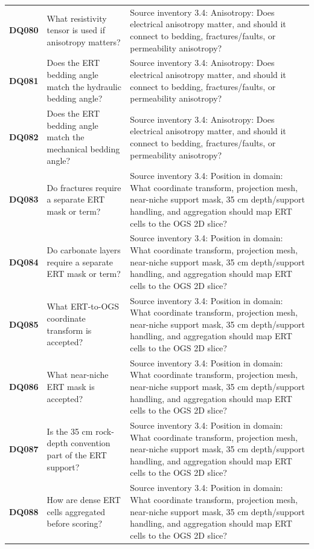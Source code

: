 \begin{longtable}{@{}L{0.09\textwidth} L{0.31\textwidth} L{0.52\textwidth}@{}}
\addlinespace[0.18em]
\textbf{DQ080} & What resistivity tensor is used if anisotropy matters? & Source inventory 3.4: Anisotropy: Does electrical anisotropy matter, and should it connect to bedding, fractures/faults, or permeability anisotropy?\\
\addlinespace[0.18em]
\textbf{DQ081} & Does the ERT bedding angle match the hydraulic bedding angle? & Source inventory 3.4: Anisotropy: Does electrical anisotropy matter, and should it connect to bedding, fractures/faults, or permeability anisotropy?\\
\addlinespace[0.18em]
\textbf{DQ082} & Does the ERT bedding angle match the mechanical bedding angle? & Source inventory 3.4: Anisotropy: Does electrical anisotropy matter, and should it connect to bedding, fractures/faults, or permeability anisotropy?\\
\addlinespace[0.18em]
\textbf{DQ083} & Do fractures require a separate ERT mask or term? & Source inventory 3.4: Position in domain: What coordinate transform, projection mesh, near-niche support mask, 35 cm depth/support handling, and aggregation should map ERT cells to the OGS 2D slice?\\
\addlinespace[0.18em]
\textbf{DQ084} & Do carbonate layers require a separate ERT mask or term? & Source inventory 3.4: Position in domain: What coordinate transform, projection mesh, near-niche support mask, 35 cm depth/support handling, and aggregation should map ERT cells to the OGS 2D slice?\\
\addlinespace[0.18em]
\textbf{DQ085} & What ERT-to-OGS coordinate transform is accepted? & Source inventory 3.4: Position in domain: What coordinate transform, projection mesh, near-niche support mask, 35 cm depth/support handling, and aggregation should map ERT cells to the OGS 2D slice?\\
\addlinespace[0.18em]
\textbf{DQ086} & What near-niche ERT mask is accepted? & Source inventory 3.4: Position in domain: What coordinate transform, projection mesh, near-niche support mask, 35 cm depth/support handling, and aggregation should map ERT cells to the OGS 2D slice?\\
\addlinespace[0.18em]
\textbf{DQ087} & Is the 35 cm rock-depth convention part of the ERT support? & Source inventory 3.4: Position in domain: What coordinate transform, projection mesh, near-niche support mask, 35 cm depth/support handling, and aggregation should map ERT cells to the OGS 2D slice?\\
\addlinespace[0.18em]
\textbf{DQ088} & How are dense ERT cells aggregated before scoring? & Source inventory 3.4: Position in domain: What coordinate transform, projection mesh, near-niche support mask, 35 cm depth/support handling, and aggregation should map ERT cells to the OGS 2D slice?\\

\end{longtable}
